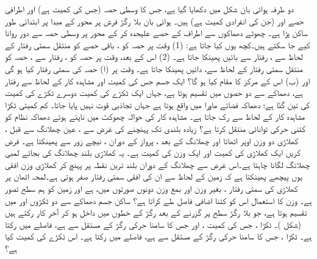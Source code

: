 دو طرفہ ہوائی بان شکل  میں دکھایا گیا ہے، جس کا وسطی حصہ  (جس کی کمیت    ہے)   اور اطرافی حصے  اور   (جن کی   انفرادی  کمیت  ہے) ہیں۔ ہوائی بان بلا رگڑ فرش پر  محور کے مبدا پر ابتدائی طور ساکن پڑا ہے۔ چھوٹے دھماکوں  سے اطراف کے حصے علیحدہ کر کے  محور پر وسطی حصہ سے دور روانا کیے جا سکتے ہیں۔کچھ یوں کیا جاتا ہے: (1)  وقت  پر  حصہ  کو   ،   باقی حصے کو منتقل سمتی  رفتار کے لحاظ سے ،  رفتار سے بائیں پھینکا جاتا ہے۔ (2) اس کے بعد، وقت  پر   حصہ  کو ،  رفتار سے ،  حصہ   کو منتقل  سمتی رفتار کے لحاظ سے، دائیں پھینکا جاتا ہے۔ وقت  پر (ا)  حصہ  کی سمتی رفتار کیا ہو گی  اور (ب)  اس کے مرکز کا مقام کیا ہو گا؟
  ایک جسم جس کی کمیت   اور مشاہدہ کار کے لحاظ سے رفتار  ہے، دھماکے سے دو حصوں میں تقسیم ہوتا ہے، جہاں ایک ٹکڑے کی کمیت دوسرے ٹکڑے کی کمیت کی تین گنّا ہے؛ دھماکہ  فضائے ماورا  میں واقع ہوتا ہے جہاں تجاذبی قوت نہیں پایا جاتا۔ کم کمیتی ٹکڑا مشاہدہ کار کے لحاظ سے رک جاتا ہے۔ مشاہدہ کار کی حوالہ چھوکٹ  میں ناپتے ہوئے دھماکہ نظام کو کتنی حرکی توانائی منتقل کرتا ہے؟
زیادہ بلندی تک پہنچنے   کی غرض سے   ، عین  چھلانگ     سے قبل ، کھلاڑی دو    وزن  اوپر اٹھاتا اور چھلانگ کے بعد  ، پرواز کے دوران ، نیچے  زور سے  پھینکتا ہے۔  فرض کریں  ایک  کھلاڑی کی کمیت  اور   ایک وزن کی کمیت  ہے۔ یہ کھلاڑی بلند چھلانگ کی بجائے لمبی چھلانگ لگانا چاہتا ہے۔اس غرض سے چھلانگ کے دوران بلند ترین نقطہ پر پہنچ کر کھلاڑی وزن افقی یوں  پیچھے  پھینکتا ہے کہ زمین کے لحاظ سے ان کی افقی سمتی  رفتار صفر ہوتی ہے۔لمحہ  اٹھان پر کھلاڑی کی سمتی رفتار ، بغیر وزن اور بمع وزن دونوں صورتوں میں،  ہے اور زمین  کو ہم سطح  تصور ہے۔ وزن کا استعمال اس کو کتنا  اضافی فاصل طے کراتا ہے؟
ساکن جسم دھماکے سے دو ٹکڑوں  اور  میں تقسیم ہوتا ہے، جو بلا رگڑ سطح  پر  گزرنے کے بعد  رگڑ کے خطوں میں داخل ہو کر آخر کار رکتے ہیں (شکل )۔ ٹکڑا ، جس کی کمیت  ، اور جس   کا  سامنا  حرکی رگڑ کے مستقل سے  ہے،  فاصلے میں رکتا ہے۔  ٹکڑا ، جس   کا  سامنا  حرکی رگڑ کے مستقل سے  ہے،  فاصلے میں رکتا ہے۔ اس ٹکڑے کی کمیت کیا ہے؟

